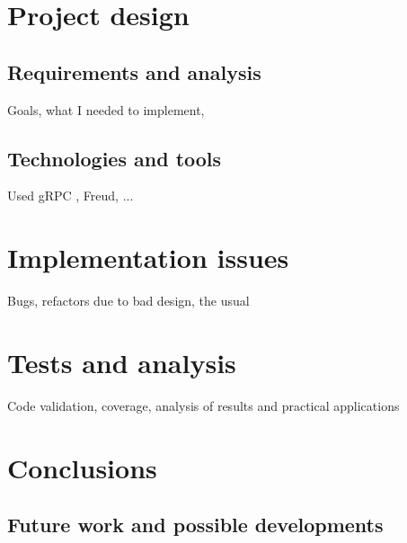 \chapter{Project design}

    \section{Requirements and analysis}

        Goals, what I needed to implement, 


    \section{Technologies and tools}

        Used gRPC \cite{gRPCdocs}, Freud, ...


\chapter{Implementation issues}

    Bugs, refactors due to bad design, the usual


\chapter{Tests and analysis}

    Code validation, coverage, analysis of results and practical applications


\chapter{Conclusions}

	\section{Future work and possible developments}

